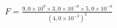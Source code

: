 \documentclass[preview,border=1pt,12pt]{standalone}
\begin{document}
$\displaystyle F = \frac{9{,}0 \times 10^{9} \times 3{,}0 \times 10^{-9} \times 5{,}0 \times 10^{-9}}{(4{,}0 \times 10^{-2})^{2}}$
\end{document}

